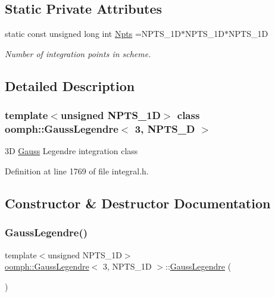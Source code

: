 \subsection*{Static Private Attributes}
\begin{DoxyCompactItemize}
\item 
static const unsigned long int \hyperlink{classoomph_1_1GaussLegendre_3_013_00_01NPTS__1D_01_4_a3aba142a86a348d09bbeca16f3d72f52}{Npts} =N\+P\+T\+S\+\_\+1D$\ast$N\+P\+T\+S\+\_\+1D$\ast$N\+P\+T\+S\+\_\+1D
\begin{DoxyCompactList}\small\item\em Number of integration points in scheme. \end{DoxyCompactList}\end{DoxyCompactItemize}


\subsection{Detailed Description}
\subsubsection*{template$<$unsigned N\+P\+T\+S\+\_\+1D$>$\newline
class oomph\+::\+Gauss\+Legendre$<$ 3, N\+P\+T\+S\+\_\+D $>$}

3D \hyperlink{classoomph_1_1Gauss}{Gauss} Legendre integration class 

Definition at line 1769 of file integral.\+h.



\subsection{Constructor \& Destructor Documentation}
\mbox{\label{classoomph_1_1GaussLegendre_3_013_00_01NPTS__1D_01_4_a39d9c8ab477cb99c02964539dff34e18}} 
\subsubsection{\texorpdfstring{Gauss\+Legendre()}{GaussLegendre()}}
{\footnotesize\ttfamily template$<$unsigned N\+P\+T\+S\+\_\+1D$>$ \\
\hyperlink{classoomph_1_1GaussLegendre}{oomph\+::\+Gauss\+Legendre}$<$ 3, N\+P\+T\+S\+\_\+1D $>$\+::\hyperlink{classoomph_1_1GaussLegendre}{Gauss\+Legendre} (\begin{DoxyParamCaption}{ }\end{DoxyParamCaption})}



